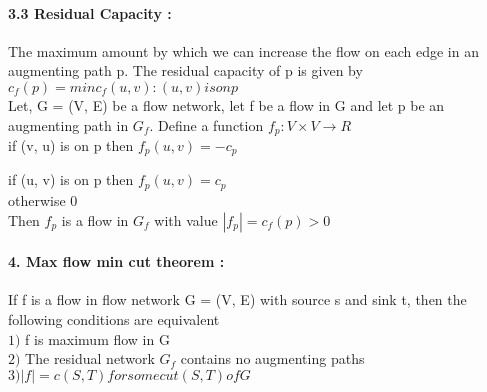 \documentclass[a4paper,12pt]{article}
\begin{document}
	\paragraph*{3.3 Residual Capacity :  \\}
	{
	    The maximum amount by which we can increase the flow on each edge in an augmenting path p. The residual capacity of p is given by   \\
	    
	    $ c_{f}(p) = min{c_{f}(u, v) : (u, v) is on p } $     \\
	    
	    Let, G = (V, E) be a flow network, let f be a  flow in G and let p be an augmenting path in $ G_{f} $. Define a  function $ f_{p} : V \times V \rightarrow R $   \\
	    
	   
	 
	    if (v, u) is on p   then $ f_{p}(u, v) = -c_{p} $
	    
	    if (u, v) is on p   then $ f_{p}(u, v) = c_{p}   $    \\
	    
	    otherwise 0   \\ 
	    
	    Then $ f_{p} $ is a flow in $ G_{f} $  with value $ |f_{p}| = c_{f}(p) > 0 $    \\
	    	    
	
	}
	
	
	
	\paragraph*{4. Max flow min cut theorem :  \\}
	{
	     If f is a flow in flow network G = (V, E) with source s and sink t, then the following conditions are equivalent \\
	             $ 1) $ f is maximum flow in G   \\
	             $ 2) $ The residual network $ G_{f} $ contains no augmenting paths  \\
	             $ 3)   |f| = c(S, T)  for some cut(S, T) of G $    \\
	
	
	}
	
	
\end{document}
